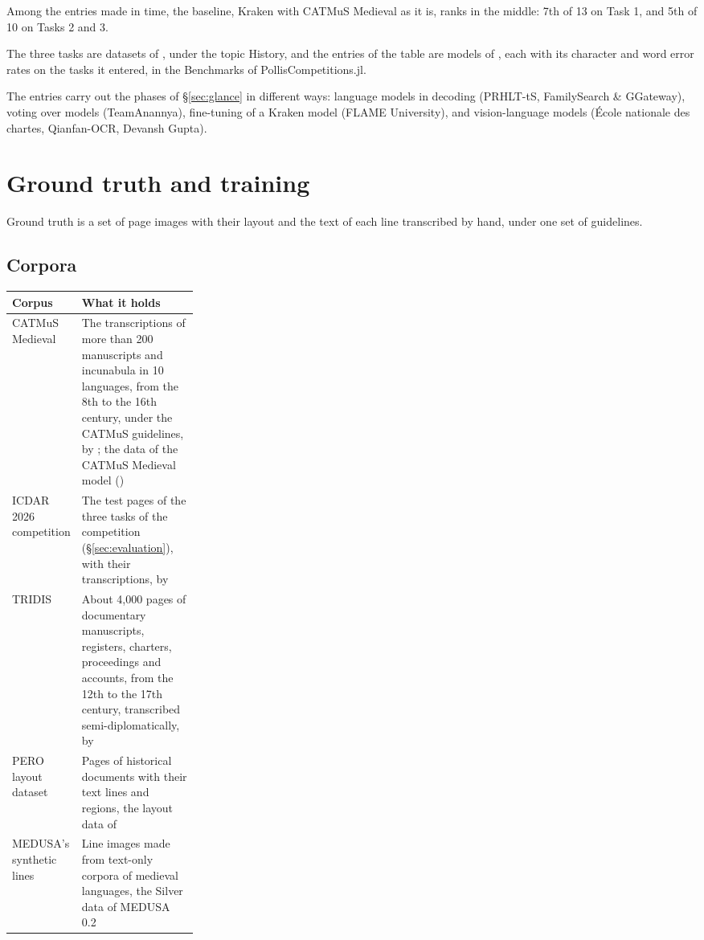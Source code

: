 Among the entries made in time, the baseline, Kraken with CATMuS Medieval as it is, ranks in the middle: 7th of 13
on Task 1, and 5th of 10 on Tasks 2 and 3.

The three tasks are datasets of \gt{}\gt{}, under
the topic History, and the entries of the table are models of \gt{}\gt{}, each with its character and word error rates on the tasks it entered, in the Benchmarks of
PollisCompetitions.jl.

The entries carry out the phases of \S\ref{sec:glance} in different ways: language models in decoding (PRHLT-tS,
FamilySearch \& GGateway), voting over models (TeamAnannya), fine-tuning of a Kraken model (FLAME University), and
vision-language models (École nationale des chartes, Qianfan-OCR, Devansh Gupta).

\section{Ground truth and training}\label{sec:training}
Ground truth is a set of page images with their layout and the text of each line transcribed by hand, under one set
of guidelines.

\subsection{Corpora}
\begin{center}\small
\begin{tabularx}{\linewidth}{@{}p{0.27\linewidth}L@{}}
\toprule
\textbf{Corpus} & \textbf{What it holds} \\
\midrule
CATMuS Medieval & The transcriptions of more than 200 manuscripts and incunabula in 10 languages, from the 8th to
  the 16th century, under the CATMuS guidelines, by ; the
  data of the CATMuS Medieval model () \\
ICDAR 2026 competition & The test pages of the three tasks of the competition (\S\ref{sec:evaluation}), with their
  transcriptions, by  \\
TRIDIS & About 4,000 pages of documentary manuscripts, registers, charters, proceedings and accounts, from the 12th to
  the 17th century, transcribed semi-diplomatically, by  \\
PERO layout dataset & Pages of historical documents with their text lines and regions, the layout data of
   \\
MEDUSA's synthetic lines & Line images made from text-only corpora of medieval languages, the Silver data of
  MEDUSA 0.2 \\
\bottomrule
\end{tabularx}
\end{center}

